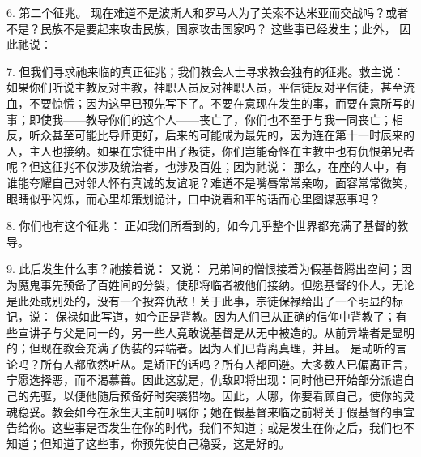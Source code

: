 6. 第二个征兆。 现在难道不是波斯人和罗马人为了美索不达米亚而交战吗？或者不是？民族不是要起来攻击民族，国家攻击国家吗？ 这些事已经发生；此外， 因此祂说： \par

7. 但我们寻求祂来临的真正征兆；我们教会人士寻求教会独有的征兆。救主说：  如果你们听说主教反对主教，神职人员反对神职人员，平信徒反对平信徒，甚至流血，不要惊慌；因为这早已预先写下了。不要在意现在发生的事，而要在意所写的事；即使我——教导你们的这个人——丧亡了，你们也不至于与我一同丧亡；相反，听众甚至可能比导师更好，后来的可能成为最先的，因为连在第十一时辰来的人，主人也接纳。如果在宗徒中出了叛徒，你们岂能奇怪在主教中也有仇恨弟兄者呢？但这征兆不仅涉及统治者，也涉及百姓；因为祂说：  那么，在座的人中，有谁能夸耀自己对邻人怀有真诚的友谊呢？难道不是嘴唇常常亲吻，面容常常微笑，眼睛似乎闪烁，而心里却策划诡计，口中说着和平的话而心里图谋恶事吗？\par

8. 你们也有这个征兆：  正如我们所看到的，如今几乎整个世界都充满了基督的教导。\par

9. 此后发生什么事？祂接着说： 又说： 兄弟间的憎恨接着为假基督腾出空间；因为魔鬼事先预备了百姓间的分裂，使那将临者被他们接纳。但愿基督的仆人，无论是此处或别处的，没有一个投奔仇敌！关于此事，宗徒保禄给出了一个明显的标记，说：  保禄如此写道，如今正是背教。因为人们已从正确的信仰中背教了；有些宣讲子与父是同一的，另一些人竟敢说基督是从无中被造的。从前异端者是显明的；但现在教会充满了伪装的异端者。因为人们已背离真理，并且。 是动听的言论吗？所有人都欣然听从。是矫正的话吗？所有人都回避。大多数人已偏离正言，宁愿选择恶，而不渴慕善。因此这就是，仇敌即将出现：同时他已开始部分派遣自己的先驱，以便他随后预备好时突袭猎物。因此，人哪，你要看顾自己，使你的灵魂稳妥。教会如今在永生天主前叮嘱你；她在假基督来临之前将关于假基督的事宣告给你。这些事是否发生在你的时代，我们不知道；或是发生在你之后，我们也不知道；但知道了这些事，你预先使自己稳妥，这是好的。\par

